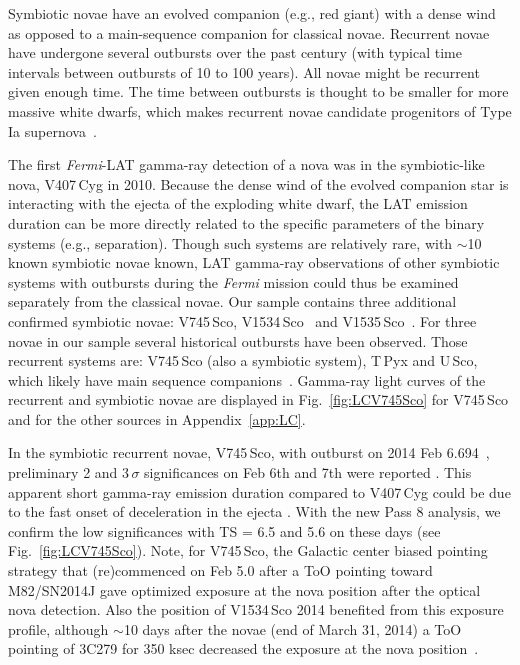 \documentclass{aa} %
\newcommand{\Fermi}{\textit{Fermi}}
\begin{document}
Symbiotic novae have an evolved companion (e.g., red giant) with a dense wind as opposed to a main-sequence companion for classical novae. Recurrent novae~\citep[see][for a review]{2010ApJS..187..275S,2015AcPPP...2..246M} have undergone several outbursts over the past century (with typical time intervals between outbursts of 10 to 100 years). 
All novae might be recurrent given enough time. The time between outbursts is thought to be smaller for more massive white dwarfs, which makes recurrent novae candidate progenitors of Type Ia supernova~\citep{2011arXiv1109.5799P}.

The first \Fermi-LAT gamma-ray detection of a nova was in the symbiotic-like nova, V407\,Cyg in 2010. Because the dense wind of the evolved companion star is interacting with the ejecta of the exploding white dwarf, the LAT emission duration can be more directly related to the specific parameters of the binary systems (e.g., separation).  Though such systems are relatively rare, with $\sim$10 known symbiotic novae known, LAT gamma-ray observations of other symbiotic systems with outbursts during the \textit{Fermi} mission could thus be examined separately from the classical novae. Our sample contains three additional confirmed symbiotic novae: V745\,Sco, V1534\,Sco~\citep{2014ATel.6032....1J} and V1535\,Sco~\citep{ATel7060}.  For three novae in our sample several historical outbursts have been observed. Those recurrent systems are: V745\,Sco (also a symbiotic system), T\,Pyx and U\,Sco, which likely have main sequence companions~\citep{1994inbi.conf.....S}. Gamma-ray light curves of the recurrent and symbiotic novae are displayed in Fig.~\ref{fig:LCV745Sco} for V745\,Sco and for the other sources in Appendix~\ref{app:LC}.

In the symbiotic recurrent novae, V745\,Sco, with outburst on 2014 Feb 6.694~\citep[CBET 3803,][]{CBET3803}, preliminary 2 and 3\,$\sigma$ significances on Feb 6th and 7th were reported \citep{2014ATel.5879....1C}. This apparent short gamma-ray emission duration compared to V407\,Cyg could be due to the fast onset of deceleration in the ejecta \citep{ban14}. With the new Pass 8 analysis, we confirm the low significances with TS = 6.5 and 5.6 on these days (see Fig.~\ref{fig:LCV745Sco}). Note, for V745\,Sco, the Galactic center biased pointing strategy that (re)commenced on Feb 5.0 after a ToO pointing toward M82/SN2014J gave optimized exposure at the nova position after the optical nova detection. Also the position of V1534\,Sco 2014 benefited from this exposure profile, although $\sim$10 days after the novae (end of March 31, 2014) a ToO pointing of 3C279 for 350 ksec decreased the exposure at the nova position~\citep{ATel6036}.
\end{document}
